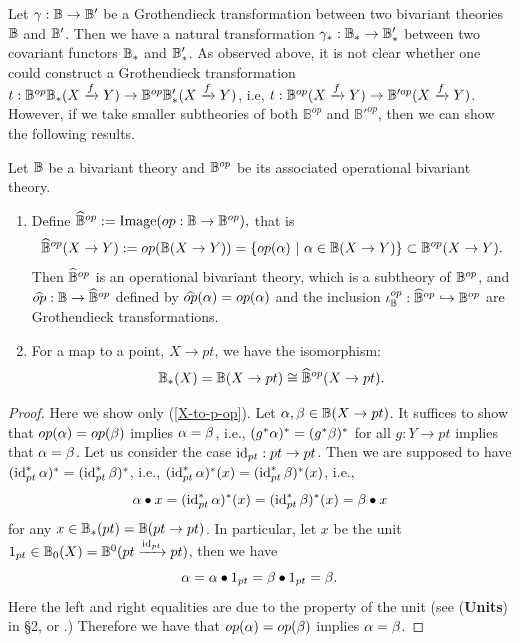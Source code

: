 \documentclass[a4paper]{amsart}
\begin{document}
Let $\gamma:\mathbb B \to \mathbb B'$ be a Grothendieck transformation between two bivariant theories $\mathbb B$ and $\mathbb B'$. Then we have a natural transformation $\gamma_*:\mathbb B_* \to \mathbb B_*'$ between two covariant functors $\mathbb B_*$ and $\mathbb B'_*$. As observed above, it is not clear whether one could construct a Grothendieck transformation $t:\mathbb B^{op}\mathbb B_*(X \xrightarrow f Y) \to \mathbb B^{op}\mathbb B'_*(X \xrightarrow f Y)$, i.e, $t:\mathbb B^{op}(X \xrightarrow f Y) \to \mathbb B'^{op}(X \xrightarrow f Y)$. However, 
if we take smaller subtheories of both $\mathbb B^{op}$ and $\mathbb B'^{op}$, then we can show the following results.
\begin{pro}\label{pro-op} Let $\mathbb B$ be a bivariant theory and $\mathbb B^{op}$ be its associated operational bivariant theory.
\begin{enumerate}
\item Define
$\widehat{\mathbb B}^{op}:= \operatorname{Image}(op:\mathbb B \to \mathbb B^{op}),$
that is 
$$\widehat{\mathbb B}^{op}(X \to Y) := op(\mathbb B(X \to Y))  = \left \{op(\alpha) \, \, | \, \, \alpha \in \mathbb B(X \to Y) \right \} \subset \mathbb B^{op}(X \to Y).$$
Then $\widehat{\mathbb B}^{op}$ is an operational bivariant theory, which is a subtheory of $\mathbb B^{op}$, and 
$\widehat{op}: \mathbb B \to \widehat{\mathbb B}^{op}$ defined by $\widehat{op}(\alpha) = op(\alpha)$ and the inclusion 
$\iota^{op}_{\mathbb B}:\widehat{\mathbb B}^{op} \hookrightarrow \mathbb B^{op}$ are Grothendieck transformations.
\item \label{X-to-p-op} For a map to a point, $X \to pt$,  we have the isomorphism:
$$\mathbb B_*(X) = \mathbb B(X \to pt) \cong \widehat{\mathbb B}^{op} (X \to pt).$$
\end{enumerate}
\end{pro}
\begin{proof}
 Here we show only (\ref{X-to-p-op}). Let $\alpha, \beta \in \mathbb B(X \to pt)$. It suffices to show that $op(\alpha) =op(\beta)$ implies $\alpha = \beta$, i.e., $(g^*\alpha)^* =(g^*\beta)^*$ for all $g:Y \to pt$ implies that $\alpha = \beta$. Let us consider the case $\operatorname{id}_{pt}:pt \to pt$. Then we are supposed to have $(\operatorname{id}_{pt}^*\alpha)^* =(\operatorname{id}_{pt}^*\beta)^*$, i.e., $(\operatorname{id}_{pt}^*\alpha)^* (x) =(\operatorname{id}_{pt}^*\beta)^*(x)$, i.e.,
$$\alpha \bullet x =(\operatorname{id}_{pt}^*\alpha)^* (x)  = (\operatorname{id}_{pt}^*\beta)^*(x) = \beta \bullet x$$
 for any $x \in \mathbb B_*(pt)=\mathbb B(pt \to pt)$. In particular, let $x$ be the unit $1_{pt} \in \mathbb B_0(X)=\mathbb B^0(pt \xrightarrow {\operatorname{id}_{pt}} pt)$, then we have
 $$ \alpha = \alpha \bullet  1_{pt} = \beta \bullet 1_{pt} = \beta.$$
 Here the left and right equalities are due to the property of the unit (see ({\bf Units}) in \S 2, or \cite[\S 2.2 Axioms for a bivariant theory, p. 22]{FM}.) 
 Therefore we have that $op(\alpha) =op(\beta)$ implies $\alpha = \beta$.
 \end{proof} 
\end{document}
